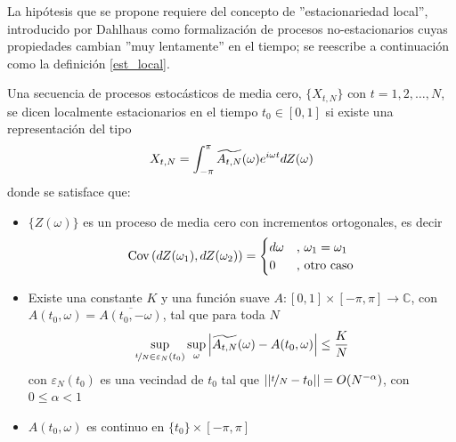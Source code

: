 La hip\'otesis que se propone 
requiere del concepto de ''estacionariedad local'', introducido por Dahlhaus 
\cite{Dahlhaus97}
como formalizaci\'on de procesos no-estacionarios
cuyas propiedades cambian ''muy lentamente'' en el tiempo;
se reescribe a continuaci\'on como la definici\'on \ref{est_local}. 

\begin{defn}
Una secuencia de procesos estoc\'asticos de media cero, 
$\{ X_{t,N} \}$ con $t = 1, 2, \dots, N$, se dicen localmente estacionarios en el 
tiempo $t_0 \in [0,1]$ si existe una representaci\'on del tipo
\begin{equation*}
X_{t,N} = \int_{-\pi}^{\pi} \widetilde{A_{t,N}}(\omega) e^{i \omega t} dZ(\omega)
\end{equation*}
donde se satisface que:
\begin{itemize}
\item $\{ Z(\omega) \}$ es un proceso de media cero con incrementos ortogonales, es decir
\begin{equation*}
\mathrm{Cov}\left( dZ(\omega_1),dZ(\omega_2) \right) =
\begin{cases}
d\omega &\text{, } \omega_1 = \omega_1 \\
0 &\text{, otro caso}
\end{cases}
\end{equation*}
\item Existe una constante $K$ y una funci\'on suave 
$A: [0,1]\times [-\pi,\pi] \rightarrow \mathbb{C}$, 
con $A(t_0,\omega) = \overline{A(t_0,-\omega)}$, tal que para toda $N$
\begin{equation*}
\sup_{\nicefrac{t}{N}\in \varepsilon_N(t_0)} 
\sup_{\omega} \left|  \widetilde{A_{t,N}}(\omega) - A(t_0,\omega)  \right|
\leq \frac{K}{N}
\end{equation*}
con $\varepsilon_N(t_0)$ es una vecindad de $t_0$ 
tal que $\left| \left| \nicefrac{t}{N}-t_0 \right| \right| = O(N^{-\alpha})$,
con $0\leq \alpha < 1$
\item $A(t_0,\omega)$ es continuo en $\{ t_0 \} \times [-\pi,\pi]$
\end{itemize}
\label{est_local}
\end{defn}

